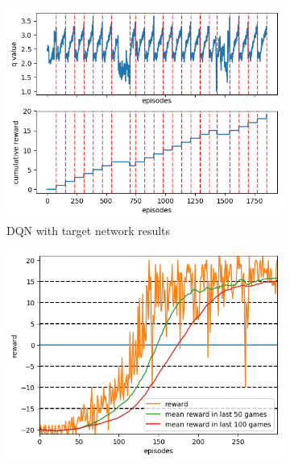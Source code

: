 \documentclass[10pt]{article}
\begin{document}
\begin{figure}
\begin{subfigure}{0.49\textwidth}
\begin{minipage}{\linewidth}
			\includegraphics[width=\linewidth]{prior_DDQN_game.png}
		\end{minipage}\vfill
		\caption{DQN with target network results}
	\end{subfigure}
	\begin{subfigure}{0.49\textwidth}
		\centering
		\begin{minipage}{\linewidth}
			\includegraphics[width=\linewidth]{duel_DDQN_reward.png}
		\end{minipage}\vfill
		\begin{minipage}{\linewidth}

\end{minipage}
\end{subfigure}
\end{figure}
\end{document}
